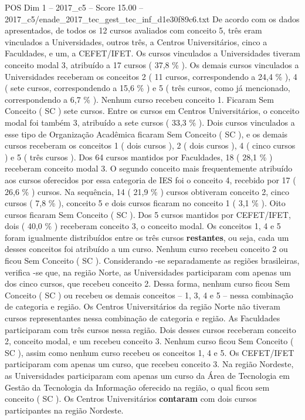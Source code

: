 \begin{textsample}{POS Dim 1 – 2017\_c5 – Score 15.00 – 2017\_c5/enade\_2017\_tec\_gest\_tec\_inf\_d1e30f89c6.txt}
De acordo com os dados apresentados, de todos os 12 cursos avaliados com conceito 5, três eram vinculados a Universidades, outros três, a Centros Universitários, cinco a Faculdades, e um, a CEFET/IFET.
Os cursos vinculados a Universidades tiveram conceito modal 3, atribuído a 17 cursos ( 37,8 \% ).
Os demais cursos vinculados a Universidades receberam os conceitos 2 ( 11 cursos, correspondendo a 24,4 \% ), 4 ( sete cursos, correspondendo a 15,6 \% ) e 5 ( três cursos, como já mencionado, correspondendo a 6,7 \% ).
Nenhum curso recebeu conceito 1.
Ficaram Sem Conceito ( SC ) sete cursos.
Entre os cursos em Centros Universitários, o conceito modal foi também 3, atribuído a sete cursos ( 33,3 \% ).
Dois cursos vinculados a esse tipo de Organização Acadêmica ficaram Sem Conceito ( SC ), e os demais cursos receberam os conceitos 1 ( dois cursos ), 2 ( dois cursos ), 4 ( cinco cursos ) e 5 ( três cursos ).
Dos 64 cursos mantidos por Faculdades, 18 ( 28,1 \% ) receberam conceito modal 3.
O segundo conceito mais frequentemente atribuído aos cursos oferecidos por essa categoria de IES foi o conceito 4, recebido por 17 ( 26,6 \% ) cursos.
Na sequência, 14 ( 21,9 \% ) cursos obtiveram conceito 2, cinco cursos ( 7,8 \% ), conceito 5 e dois cursos ficaram no conceito 1 ( 3,1 \% ).
Oito cursos ficaram Sem Conceito ( SC ).
Dos 5 cursos mantidos por CEFET/IFET, dois ( 40,0 \% ) receberam conceito 3, o conceito modal.
Os conceitos 1, 4 e 5 foram igualmente distribuídos entre os três cursos \textbf{restantes}, ou seja, cada um desses conceitos foi atribuído a um curso.
Nenhum curso recebeu conceito 2 ou ficou Sem Conceito ( SC ).
Considerando -se separadamente as regiões brasileiras, verifica -se que, na região Norte, as Universidades participaram com apenas um dos cinco cursos, que recebeu conceito 2.
Dessa forma, nenhum curso ficou Sem Conceito ( SC ) ou recebeu os demais conceitos – 1, 3, 4 e 5 – nessa combinação de categoria e região.
Os Centros Universitários da região Norte não tiveram cursos representantes nessa combinação de categoria e região.
As Faculdades participaram com três cursos nessa região.
Dois desses cursos receberam conceito 2, conceito modal, e um recebeu conceito 3.
Nenhum curso ficou Sem Conceito ( SC ), assim como nenhum curso recebeu os conceitos 1, 4 e 5.
Os CEFET/IFET participaram com apenas um curso, que recebeu conceito 3.
Na região Nordeste, as Universidades participaram com apenas um curso da Área de Tecnologia em Gestão da Tecnologia da Informação oferecido na região, o qual ficou sem conceito ( SC ).
Os Centros Universitários \textbf{contaram} com dois cursos participantes na região Nordeste.

\end{textsample}
